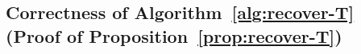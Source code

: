 \subsection{Correctness of Algorithm~\ref{alg:recover-T} (Proof of Proposition~\ref{prop:recover-T})}
\label{sec:recover-T-proof}
